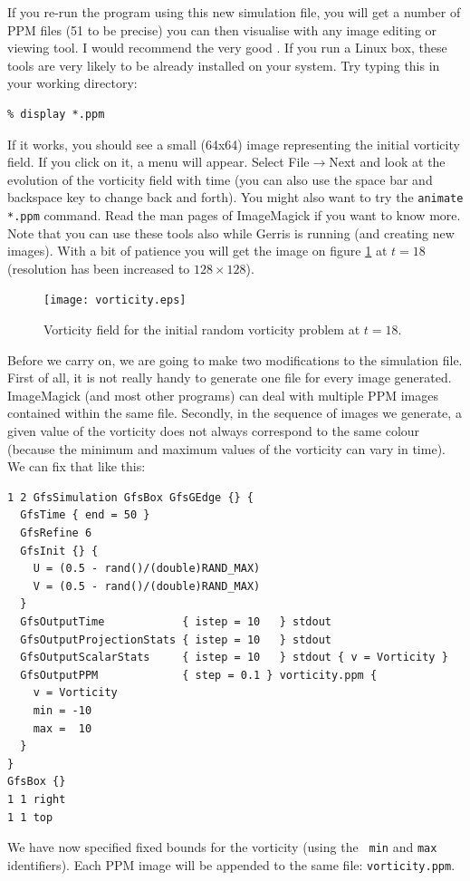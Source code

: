 \documentclass[a4paper]{article}
\newcommand{\htmladdnormallinkfoot}[2]{\footahref{#2}{#1}}
\begin{document}
If you re-run the program using this new simulation file, you will get
a number of {\sc PPM} files (51 to be precise) you can then visualise
with any image editing or viewing tool. I would recommend the very
good \htmladdnormallinkfoot{ImageMagick toolbox}{http://www.imagemagick.org}. If you
run a Linux box, these tools are very likely to be already installed
on your system. Try typing this in your working directory:
\begin{verbatim}
% display *.ppm
\end{verbatim}
If it works, you should see a small (64x64) image representing the
initial vorticity field. If you click on it, a menu will
appear. Select File$\rightarrow$Next and look at the evolution of the
vorticity field with time (you can also use the space bar and
backspace key to change back and forth). You might also want to try
the {\tt animate *.ppm} command. Read the man pages of ImageMagick if
you want to know more. Note that you can use these tools also while
Gerris is running (and creating new images). With a bit of patience
you will get the image on figure \ref{vorticity} at $t=18$ (resolution
has been increased to $128\times 128$).
\begin{figure}
\begin{center}
\texttt{[image: vorticity.eps]}
\end{center}
\caption{Vorticity field for the initial random vorticity problem at
$t=18$.}
\label{vorticity}
\end{figure}

Before we carry on, we are going to make two modifications to the
simulation file. First of all, it is not really handy to generate one
file for every image generated. ImageMagick (and most other programs)
can deal with multiple {\sc PPM} images contained within the same
file. Secondly, in the sequence of images we generate, a given value
of the vorticity does not always correspond to the same colour
(because the minimum and maximum values of the vorticity can vary in
time). We can fix that like this:
\begin{verbatim}
1 2 GfsSimulation GfsBox GfsGEdge {} {
  GfsTime { end = 50 }
  GfsRefine 6
  GfsInit {} {
    U = (0.5 - rand()/(double)RAND_MAX)
    V = (0.5 - rand()/(double)RAND_MAX)
  }  
  GfsOutputTime            { istep = 10   } stdout
  GfsOutputProjectionStats { istep = 10   } stdout
  GfsOutputScalarStats     { istep = 10   } stdout { v = Vorticity }
  GfsOutputPPM             { step = 0.1 } vorticity.ppm {
    v = Vorticity 
    min = -10
    max =  10
  }
}
GfsBox {}
1 1 right
1 1 top
\end{verbatim}
We have now specified fixed bounds for the vorticity (using the {\tt
min} and {\tt max} identifiers). Each {\sc PPM} image will be appended to
the same file: {\tt vorticity.ppm}.
\end{document}
